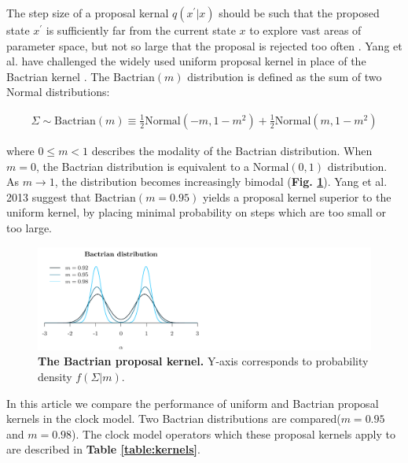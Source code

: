 \documentclass[10pt,letterpaper]{article}
\begin{document}

The step size of a proposal kernal $q(x^\prime|x)$ should be such that the proposed state $x^\prime$ is sufficiently far from the current state $x$ to explore vast areas of parameter space, but not so large that the proposal is rejected too often \cite{roberts1997weak}. Yang et al. have challenged the widely used uniform proposal kernel in place of the Bactrian kernel \cite{yang2013searching, thawornwattana2018designing}.
The $\text{Bactrian}(m)$ distribution is defined as the sum of two Normal distributions:


\begin{align}
	\Sigma \sim \text{Bactrian}(m) \equiv \frac{1}{2}\text{Normal}(-m, 1-m^2) + \frac{1}{2}\text{Normal}(m, 1-m^2)
\end{align}


where $0 \leq m < 1$ describes the modality of the Bactrian distribution. When $m=0$, the Bactrian distribution is equivalent to a $\text{Normal}(0, 1)$ distribution. As $m \rightarrow 1$, the distribution becomes increasingly bimodal (\textbf{Fig. \ref{fig:bactrian}}). Yang et al. 2013 \cite{yang2013searching} suggest that $\text{Bactrian}(m=0.95)$ yields a proposal kernel superior to the uniform kernel, by placing minimal probability on steps which are too small or too large.



\begin{figure}[!h]
\includegraphics[width=\textwidth]{Figures/bactrian.pdf}
\caption{\textbf{The Bactrian proposal kernel.} Y-axis corresponds to probability density $f(\Sigma|m)$.  }
\label{fig:bactrian}
\end{figure}





In this article we compare the performance of uniform and Bactrian proposal kernels in the clock model. Two Bactrian distributions are compared($m=0.95$ and $m=0.98$). The clock model operators which these proposal kernels apply to are described in \textbf{Table \ref{table:kernels}}.
\end{document}
